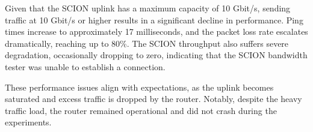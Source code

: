 Given that the SCION uplink has a maximum capacity of 10 Gbit/s, sending traffic at 10 Gbit/s or higher results in a significant decline in performance.
Ping times increase to approximately 17 milliseconds, and the packet loss rate escalates dramatically, reaching up to 80\%.
The SCION throughput also suffers severe degradation, occasionally dropping to zero, indicating that the SCION bandwidth tester was unable to establish a connection.

These performance issues align with expectations, as the uplink becomes saturated and excess traffic is dropped by the router.
Notably, despite the heavy traffic load, the router remained operational and did not crash during the experiments.

